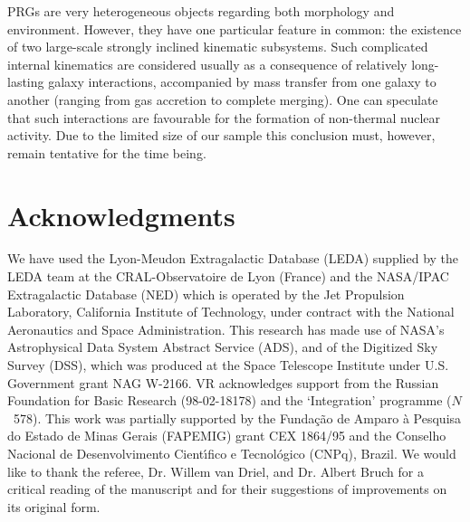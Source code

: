 PRGs  are  very   heterogeneous   objects  regarding  both  morphology  and
environment.  However,  they have one  particular  feature in  common:  the
existence of two large-scale strongly inclined kinematic  subsystems.  Such
complicated  internal kinematics are considered usually as a consequence of
relatively  long-lasting galaxy interactions,  accompanied by mass transfer
from one  galaxy  to  another  (ranging  from  gas  accretion  to  complete
merging).  One can speculate that such  interactions are favourable for the
formation of non-thermal  nuclear activity.  Due to the limited size of our
sample this conclusion must, however, remain  tentative for the time being.

\section*{Acknowledgments}

We have used the Lyon-Meudon  Extragalactic Database (LEDA) supplied by the
LEDA  team at the  CRAL-Observatoire  de Lyon  (France)  and the  NASA/IPAC
Extragalactic  Database  (NED)  which  is  operated  by the Jet  Propulsion
Laboratory,  California  Institute of Technology,  under  contract with the
National Aeronautics and Space  Administration.  This research has made use
of NASA's  Astrophysical  Data System  Abstract  Service  (ADS), and of the
Digitized  Sky Survey  (DSS),  which was  produced  at the Space  Telescope
Institute under U.S.  Government grant NAG W-2166.  VR acknowledges support
from the  Russian  Foundation  for  Basic  Research  (98-02-18178)  and the
`Integration'  programme  ($N$~578).  This work was partially  supported by
the  Funda\c{c}\~{a}o  de Amparo  \`{a}  Pesquisa do Estado de Minas Gerais
(FAPEMIG)  grant CEX 1864/95 and the Conselho  Nacional de  Desenvolvimento
Cient\'{\i}fico e  Tecnol\'{o}gico  (CNPq), Brazil.  We would like to thank
the  referee,  Dr.  Willem van Driel, and Dr.  Albert  Bruch for a critical
reading of the manuscript and for their  suggestions of improvements on its
original form.

